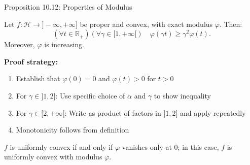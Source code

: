 \documentclass[aspectratio=169,10pt]{beamer}
\begin{document}
\begin{frame}[allowframebreaks]{Proposition 10.12: Properties of Modulus}
\begin{proposition}
Let $f: \mathcal{H} \to ]-\infty, +\infty]$ be proper and convex, with exact modulus $\varphi$. Then:
\[
(\forall t \in \mathbb{R}_+)(\forall \gamma \in [1, +\infty[) \quad \varphi(\gamma t) \geq \gamma^2 \varphi(t).
\]
Moreover, $\varphi$ is increasing.
\end{proposition}

\textbf{Proof strategy:}
\begin{enumerate}
\item Establish that $\varphi(0) = 0$ and $\varphi(t) > 0$ for $t > 0$
\item For $\gamma \in ]1, 2]$: Use specific choice of $\alpha$ and $\gamma$ to show inequality
\item For $\gamma \in [2, +\infty[$: Write as product of factors in $]1, 2]$ and apply repeatedly
\item Monotonicity follows from definition
\end{enumerate}

\begin{corollary}
$f$ is uniformly convex if and only if $\varphi$ vanishes only at 0; in this case, $f$ is uniformly convex with modulus $\varphi$.
\end{corollary}
\end{frame}
\end{document}
